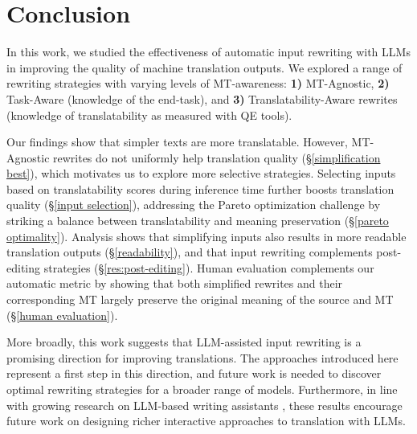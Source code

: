 \section{Conclusion}

In this work, we studied the effectiveness of automatic input rewriting with LLMs in improving the quality of machine translation outputs. We explored a range of rewriting strategies with varying levels of MT-awareness: \textbf{1)} MT-Agnostic, \textbf{2)} Task-Aware (knowledge of the end-task), and \textbf{3)} Translatability-Aware rewrites (knowledge of translatability as measured with QE tools).

Our findings show that simpler texts are more translatable. However, MT-Agnostic rewrites do not uniformly help translation quality (\S \ref{simplification best}), which motivates us to explore more selective strategies. Selecting inputs based on translatability scores during inference time further boosts translation quality (\S \ref{input selection}), addressing the Pareto optimization challenge by striking a balance between translatability and meaning preservation (\S \ref{pareto optimality}). Analysis shows that simplifying inputs also results in more readable translation outputs (\S \ref{readability}), and that input rewriting complements post-editing strategies (\S \ref{res:post-editing}). Human evaluation complements our automatic metric by showing that both simplified rewrites and their corresponding MT largely preserve the original meaning of the source and MT (\S \ref{human evaluation}).

More broadly, this work suggests that LLM-assisted input rewriting is a promising direction for improving translations. The approaches introduced here represent a first step in this direction, and future work is needed to discover optimal rewriting strategies for a broader range of models. Furthermore, in line with growing research on LLM-based writing assistants \citep{Lee_2024}, these results encourage future work on designing richer interactive approaches to translation with LLMs.

